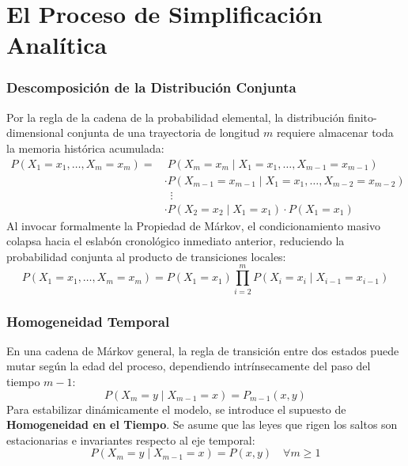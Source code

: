 \documentclass[10pt]{book}
\begin{document}
\section{El Proceso de Simplificación Analítica}

\subsubsection{Descomposición de la Distribución Conjunta}
\noindent
Por la regla de la cadena de la probabilidad elemental, la distribución finito-dimensional conjunta de una trayectoria de longitud $m$ requiere almacenar toda la memoria histórica acumulada:
\begin{align*}
    P(X_1 = x_1, \dots, X_m = x_m) = & \; P(X_m = x_m \mid X_1 = x_1, \dots, X_{m-1} = x_{m-1}) \\
    & \cdot P(X_{m-1} = x_{m-1} \mid X_1 = x_1, \dots, X_{m-2} = x_{m-2}) \\
    & \;\; \vdots \\
    & \cdot P(X_2 = x_2 \mid X_1 = x_1) \cdot P(X_1 = x_1)
\end{align*}
Al invocar formalmente la Propiedad de Márkov, el condicionamiento masivo colapsa hacia el eslabón cronológico inmediato anterior, reduciendo la probabilidad conjunta al producto de transiciones locales:
\begin{equation*}
    P(X_1 = x_1, \dots, X_m = x_m) = P(X_1 = x_1) \prod_{i=2}^{m} P(X_i = x_i \mid X_{i-1} = x_{i-1})
\end{equation*}

\subsubsection{Homogeneidad Temporal}
\noindent
En una cadena de Márkov general, la regla de transición entre dos estados puede mutar según la edad del proceso, dependiendo intrínsecamente del paso del tiempo $m-1$:
\begin{equation*}
    P(X_m = y \mid X_{m-1} = x) = P_{m-1}(x, y)
\end{equation*}
Para estabilizar dinámicamente el modelo, se introduce el supuesto de \textbf{Homogeneidad en el Tiempo}. Se asume que las leyes que rigen los saltos son estacionarias e invariantes respecto al eje temporal:
\begin{equation*}
    P(X_m = y \mid X_{m-1} = x) = P(x, y) \quad \forall m \geq 1
\end{equation*}
\end{document}
